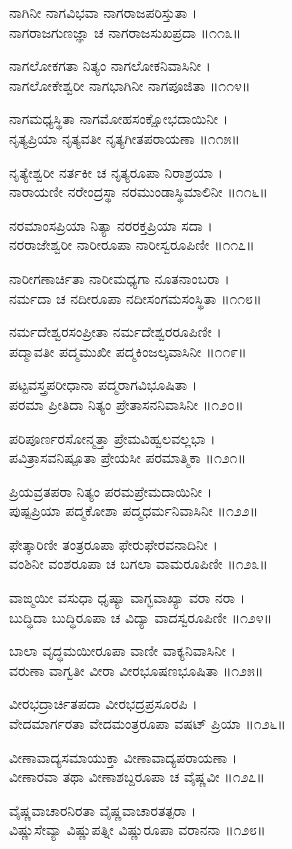 ನಾಗಿನೀ ನಾಗವಿಭವಾ ನಾಗರಾಜಪರಿಸ್ತುತಾ ।\\
ನಾಗರಾಜಗುಣಜ್ಞಾ ಚ ನಾಗರಾಜಸುಖಪ್ರದಾ ॥೧೧೩॥

ನಾಗಲೋಕಗತಾ ನಿತ್ಯಂ ನಾಗಲೋಕನಿವಾಸಿನೀ ।\\
ನಾಗಲೋಕೇಶ್ವರೀ ನಾಗಭಾಗಿನೀ ನಾಗಪೂಜಿತಾ ॥೧೧೪॥

ನಾಗಮಧ್ಯಸ್ಥಿತಾ ನಾಗಮೋಹಸಂಕ್ಷೋಭದಾಯಿನೀ ।\\
ನೃತ್ಯಪ್ರಿಯಾ ನೃತ್ಯವತೀ ನೃತ್ಯಗೀತಪರಾಯಣಾ ॥೧೧೫॥

ನೃತ್ಯೇಶ್ವರೀ ನರ್ತಕೀ ಚ ನೃತ್ಯರೂಪಾ ನಿರಾಶ್ರಯಾ ।\\
ನಾರಾಯಣೀ ನರೇಂದ್ರಸ್ಥಾ ನರಮುಂಡಾಸ್ಥಿಮಾಲಿನೀ ॥೧೧೬॥

ನರಮಾಂಸಪ್ರಿಯಾ ನಿತ್ಯಾ ನರರಕ್ತಪ್ರಿಯಾ ಸದಾ ।\\
ನರರಾಜೇಶ್ವರೀ ನಾರೀರೂಪಾ ನಾರೀಸ್ವರೂಪಿಣೀ ॥೧೧೭॥

ನಾರೀಗಣಾರ್ಚಿತಾ ನಾರೀಮಧ್ಯಗಾ ನೂತನಾಂಬರಾ ।\\
ನರ್ಮದಾ ಚ ನದೀರೂಪಾ ನದೀಸಂಗಮಸಂಸ್ಥಿತಾ ॥೧೧೮॥

ನರ್ಮದೇಶ್ವರಸಂಪ್ರೀತಾ ನರ್ಮದೇಶ್ವರರೂಪಿಣೀ ।\\
ಪದ್ಮಾವತೀ ಪದ್ಮಮುಖೀ ಪದ್ಮಕಿಂಜಲ್ಕವಾಸಿನೀ ॥೧೧೯॥

ಪಟ್ಟವಸ್ತ್ರಪರೀಧಾನಾ ಪದ್ಮರಾಗವಿಭೂಷಿತಾ ।\\
ಪರಮಾ ಪ್ರೀತಿದಾ ನಿತ್ಯಂ ಪ್ರೇತಾಸನನಿವಾಸಿನೀ ॥೧೨೦॥

ಪರಿಪೂರ್ಣರಸೋನ್ಮತ್ತಾ ಪ್ರೇಮವಿಹ್ವಲವಲ್ಲಭಾ ।\\
ಪವಿತ್ರಾಸವನಿಷ್ಪೂತಾ ಪ್ರೇಯಸೀ ಪರಮಾತ್ಮಿಕಾ ॥೧೨೧॥

ಪ್ರಿಯವ್ರತಪರಾ ನಿತ್ಯಂ ಪರಮಪ್ರೇಮದಾಯಿನೀ ।\\
ಪುಷ್ಪಪ್ರಿಯಾ ಪದ್ಮಕೋಶಾ ಪದ್ಮಧರ್ಮನಿವಾಸಿನೀ ॥೧೨೨॥

ಫೇತ್ಕಾರಿಣೀ ತಂತ್ರರೂಪಾ ಫೇರುಫೇರವನಾದಿನೀ ।\\
ವಂಶಿನೀ ವಂಶರೂಪಾ ಚ ಬಗಲಾ ವಾಮರೂಪಿಣೀ ॥೧೨೩॥

ವಾಙ್ಮಯೀ ವಸುಧಾ ಧೃಷ್ಯಾ ವಾಗ್ಭವಾಖ್ಯಾ ವರಾ ನರಾ ।\\
ಬುದ್ಧಿದಾ ಬುದ್ಧಿರೂಪಾ ಚ ವಿದ್ಯಾ ವಾದಸ್ವರೂಪಿಣೀ ॥೧೨೪॥

ಬಾಲಾ ವೃದ್ಧಮಯೀರೂಪಾ ವಾಣೀ ವಾಕ್ಯನಿವಾಸಿನೀ ।\\
ವರುಣಾ ವಾಗ್ವತೀ ವೀರಾ ವೀರಭೂಷಣಭೂಷಿತಾ ॥೧೨೫॥

ವೀರಭದ್ರಾರ್ಚಿತಪದಾ ವೀರಭದ್ರಪ್ರಸೂರಪಿ ।\\
ವೇದಮಾರ್ಗರತಾ ವೇದಮಂತ್ರರೂಪಾ ವಷಟ್ ಪ್ರಿಯಾ ॥೧೨೬॥

ವೀಣಾವಾದ್ಯಸಮಾಯುಕ್ತಾ ವೀಣಾವಾದ್ಯಪರಾಯಣಾ ।\\
ವೀಣಾರವಾ ತಥಾ ವೀಣಾಶಬ್ದರೂಪಾ ಚ ವೈಷ್ಣವೀ ॥೧೨೭॥

ವೈಷ್ಣವಾಚಾರನಿರತಾ ವೈಷ್ಣವಾಚಾರತತ್ಪರಾ ।\\
ವಿಷ್ಣುಸೇವ್ಯಾ ವಿಷ್ಣುಪತ್ನೀ ವಿಷ್ಣುರೂಪಾ ವರಾನನಾ ॥೧೨೮॥

